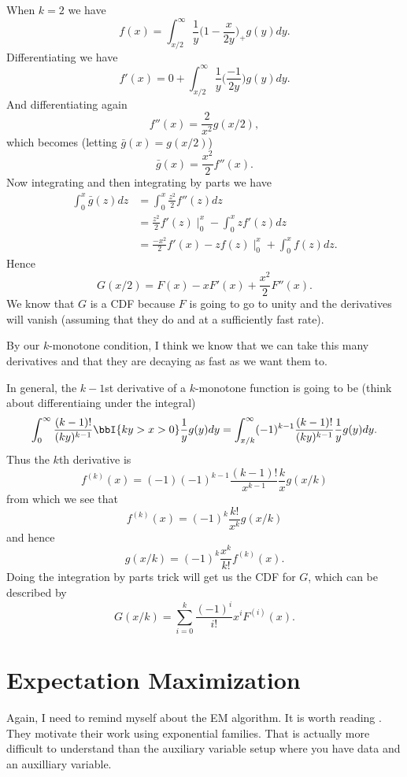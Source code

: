 \documentclass{article}
\begin{document}
When $k=2$ we have
\[
f(x) = \int_{x/2}^\infty \frac{1}{y} \Big(1 - \frac{x}{2y}\Big)_+ g(y) dy.
\]
Differentiating we have
\[
f'(x) = 0 + \int_{x/2}^\infty \frac{1}{y} \Big( \frac{-1}{2y} \Big) g(y) dy.
\]
And differentiating again
\[
f''(x) = \frac{2}{x^2} g(x/2),
\]
which becomes (letting $\bar g(x) = g(x/2)$)
\[
\bar g(x) = \frac{x^2}{2} f''(x).
\]
Now integrating and then integrating by parts we have
\begin{align*}
\int_0^x \bar g(z) dz & = \int_0^x \frac{z^2}{2} f''(z) dz \\
& = \frac{z^2}{2} f'(z) \mid_{0}^x - \int_0^x z f'(z) dz \\
& = \frac{-x^2}{2} f'(x) - z f(z) \mid_{0}^x + \int_0^x f(z) dz.
\end{align*}
Hence
\[
G(x/2) = F(x) - x F'(x) + \frac{x^2}{2} F''(x).
\]
We know that $G$ is a CDF because $F$ is going to go to unity and the
derivatives will vanish (assuming that they do and at a sufficiently fast rate).

By our $k$-monotone condition, I think we know that we can take this many
derivatives and that they are decaying as fast as we want them to.

In general, the $k-1$st derivative of a $k$-monotone function is going to be
(think about differentiaing under the integral)
\[
\int_0^\infty \frac{(k-1)!}{(ky)^{k-1}} \bbI\{ky > x > 0\} \frac{1}{y} g(y) dy
=
\int_{x/k}^\infty (-1)^{k-1} \frac{(k-1)!}{(ky)^{k-1}} \frac{1}{y} g(y) dy.
\]
Thus the $k$th derivative is
\[
f^{(k)}(x) = (-1) (-1)^{k-1} \frac{(k-1)!}{x^{k-1}} \frac{k}{x} g(x/k)
\]
from which we see that
\[
f^{(k)}(x) = (-1)^k \frac{k!}{x^k} g(x/k)
\]
and hence
\[
g(x/k) = (-1)^k \frac{x^k}{k!} f^{(k)}(x).
\]
Doing the integration by parts trick will get us the CDF for $G$, which can be
described by
\[
G(x/k) = \sum_{i=0}^k \frac{(-1)^i}{i!} x^i F^{(i)} (x).
\]

\section{Expectation Maximization}

Again, I need to remind myself about the EM algorithm.  It is worth reading
\cite{dempster-etal-1977}.  They motivate their work using exponential families.
That is actually more difficult to understand than the auxiliary variable setup
where you have data and an auxilliary variable.
\end{document}
